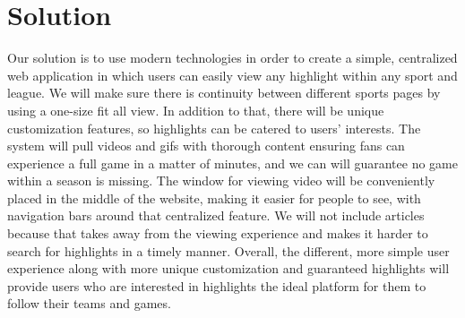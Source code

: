 \section{Solution}

\par Our solution is to use modern technologies in order to create a simple, centralized web application in which users can easily view any highlight within any sport and league. We will make sure there is continuity between different sports pages by using a one-size fit all view. In addition to that, there will be unique customization features, so highlights can be catered to users’ interests. The system will pull videos and gifs with thorough content ensuring fans can experience a full game in a matter of minutes, and we can will guarantee no game within a season is missing. The window for viewing video will be conveniently placed in the middle of the website, making it easier for people to see, with navigation bars around that centralized feature. We will not include articles because that takes away from the viewing experience and makes it harder to search for highlights in a timely manner. Overall, the different, more simple user experience along with more unique customization and guaranteed highlights will provide users who are interested in highlights the ideal platform for them to follow their teams and games. 

